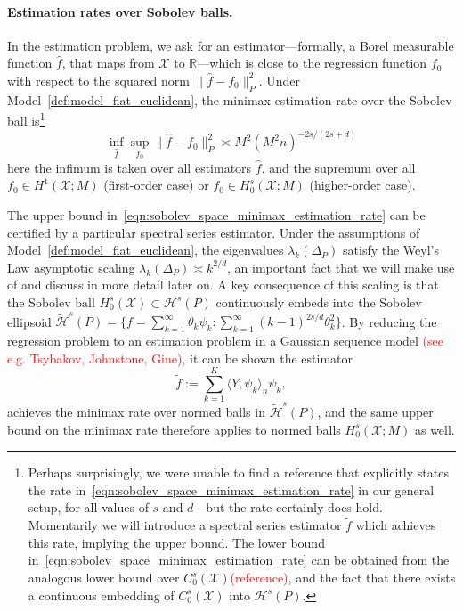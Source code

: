\documentclass{article}
\newcommand{\Reals}{\mathbb{R}}
\newcommand{\1}{\mathbf{1}}
\newcommand{\mc}[1]{\mathcal{#1}}
\newcommand{\dotp}[2]{\langle #1, #2 \rangle}
\newcommand{\wt}[1]{\widetilde{#1}}
\newcommand{\wh}[1]{\widehat{#1}}
\theoremstyle{alden}
\theoremstyle{aldenthm}
\theoremstyle{definition}
\theoremstyle{remark}
\begin{document}
\paragraph{Estimation rates over Sobolev balls.}
In the estimation problem, we ask for an estimator---formally, a Borel measurable function $\wh{f}$, that maps from $\mc{X}$ to $\Reals$---which is close to the regression function $f_0$ with respect to the squared norm $\|\wh{f} - f_0\|_{P}^2$. Under Model~\ref{def:model_flat_euclidean}, the minimax estimation rate over the Sobolev ball is\footnote{Perhaps surprisingly, we were unable to find a reference that explicitly states the rate in~\eqref{eqn:sobolev_space_minimax_estimation_rate} in our general setup, for all values of $s$ and $d$---but the rate certainly does hold.  Momentarily we will introduce a spectral series estimator $\wt{f}$ which achieves this rate, implying the upper bound. The lower bound in~\eqref{eqn:sobolev_space_minimax_estimation_rate} can be obtained from the analogous lower bound over $C_0^s(\mc{X})$\textcolor{red}{(reference)}, and the fact that there exists a continuous embedding of $C_0^s(\mc{X})$ into $\mc{H}^s(P)$.}
\begin{equation}
\label{eqn:sobolev_space_minimax_estimation_rate}
\inf_{\wh{f}} \sup_{f_0} \|\wh{f} - f_0\|_P^2 \asymp M^2(M^2n)^{-2s/(2s + d)}
\end{equation}
here the infimum is taken over all estimators $\wh{f}$, and the supremum over all $f_0 \in H^1(\mc{X};M)$ (first-order case) or $f_0 \in H_0^s(\mc{X};M)$ (higher-order case).

The upper bound in~\eqref{eqn:sobolev_space_minimax_estimation_rate} can be certified by a particular spectral series estimator.  Under the assumptions of Model~\ref{def:model_flat_euclidean}, the eigenvalues $\lambda_k(\Delta_P)$ satisfy the Weyl's Law asymptotic scaling $\lambda_{k}(\Delta_P) \asymp k^{2/d}$, an important fact that we will make use of and discuss in more detail later on. A key consequence of this scaling is that the Sobolev ball $H_0^s(\mc{X}) \subset \mc{H}^s(P)$ continuously embeds into the Sobolev ellipsoid $\mc{\wt{H}}^s(P) = \{f = \sum_{k = 1}^{\infty} \theta_k \psi_k: \sum_{k = 1}^{\infty} (k - 1)^{2s/d} \theta_k^2\}$. By reducing the regression problem to an estimation problem in a Gaussian sequence model \textcolor{red}{(see e.g. Tsybakov, Johnstone, Gine)}, it can be shown the estimator
\begin{equation}
\label{eqn:spectral_series_estimator}
\wt{f} := \sum_{k = 1}^{K} \dotp{Y}{\psi_k}_n \psi_k,
\end{equation}
achieves the minimax rate over normed balls in $\mc{\wt{H}}^s(P)$, and the same upper bound on the minimax rate therefore applies to normed balls $H_0^s(\mc{X};M)$ as well.
\end{document}
